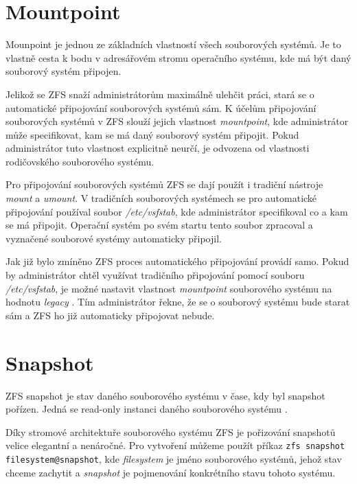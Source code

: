 \section{Mountpoint}
\label{mountpoint}
Mounpoint je jednou ze základních vlastností všech souborových systémů. Je to vlastně cesta k bodu v adresářovém stromu operačního systému, kde má být daný souborový systém připojen.

Jelikož se ZFS snaží administrátorům maximálně ulehčit práci, stará se o automatické připojování souborových systémů sám. K účelům připojování souborových systémů v ZFS slouží jejich vlastnost \emph{mountpoint}, kde administrátor může specifikovat, kam se má daný souborový systém připojit. Pokud administrátor tuto vlastnost explicitně neurčí, je odvozena od vlastnosti rodičovského souborového systému.

Pro připojování souborových systémů ZFS se dají použít i tradiční nástroje \emph{mount} a \emph{umount}. V tradičních souborových systémech se pro automatické připojování používal soubor \emph{/etc/vsfstab}, kde administrátor specifikoval co a kam se má připojit. Operační systém po svém startu tento soubor zpracoval a vyznačené souborové systémy automaticky připojil.

Jak již bylo zmíněno ZFS proces automatického připojování provádí samo. Pokud by administrátor chtěl využívat tradičního připojování pomocí souboru \emph{/etc/vsfstab}, je možné nastavit vlastnost \emph{mountpoint} souborového systému na hodnotu \emph{legacy} \cite{mountpoint}. Tím administrátor řekne, že se o souborový systému bude starat sám a ZFS ho již automaticky připojovat nebude.
\section{Snapshot}
\label{snapshot}
ZFS snapshot je stav daného souborového systému v čase, kdy byl snapshot pořízen. Jedná se read-only instanci daného souborového systému \cite{snapshot}.

Díky stromové architektuře souborového systému ZFS je pořizování snapshotů velice elegantní a nenáročné. Pro vytvoření můžeme použít příkaz \verb|zfs snapshot filesystem@snapshot|, kde \emph{filesystem} je jméno souborového systémů, jehož stav chceme zachytit a \emph{snapshot} je pojmenování konkrétního stavu tohoto systému.

